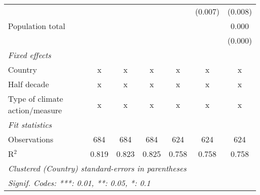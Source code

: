 \begin{tabular}{lcccccc}
                                                    &               &               &               &               & (0.007)       & (0.008)\\   
   Population total                                 &               &               &               &               &               & 0.000\\   
                                                    &               &               &               &               &               & (0.000)\\   
   \emph{Fixed effects}\\
   Country                                          & x             & x             & x             & x             & x             & x\\  
   Half decade                                      & x             & x             & x             & x             & x             & x\\  
   Type of climate action/measure                   & x             & x             & x             & x             & x             & x\\  
   \midrule \emph{Fit statistics}\\
   Observations                                     & 684           & 684           & 684           & 624           & 624           & 624\\  
   R$^2$                                            & 0.819         & 0.823         & 0.825         & 0.758         & 0.758         & 0.758\\  
   \midrule
   \multicolumn{7}{l}{\emph{Clustered (Country) standard-errors in parentheses}}\\
   \multicolumn{7}{l}{\emph{Signif. Codes: ***: 0.01, **: 0.05, *: 0.1}}\\
\end{tabular}
\par\endgroup


